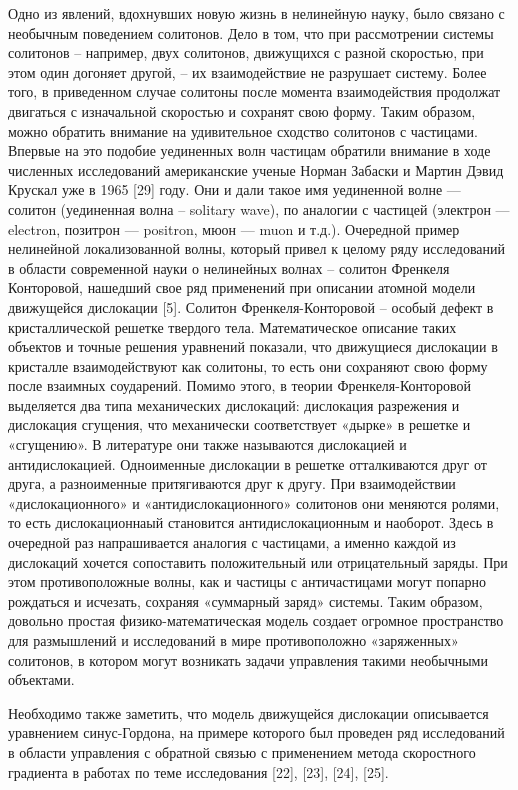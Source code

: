 Одно из явлений, вдохнувших новую жизнь в нелинейную науку, было связано с необычным поведением солитонов. Дело в том, что при рассмотрении системы солитонов – например, двух солитонов, движущихся с разной скоростью, при этом один догоняет другой, – их взаимодействие не разрушает систему. Более того, в приведенном случае солитоны после момента взаимодействия продолжат двигаться с изначальной скоростью и сохранят свою форму. Таким образом, можно обратить внимание на удивительное сходство солитонов с частицами. Впервые на это подобие уединенных волн частицам обратили внимание в ходе численных исследований американские ученые Норман Забаски и Мартин Дэвид Крускал уже в 1965 [29] году. Они и дали такое имя уединенной волне — солитон (уединенная волна – solitary wave), по аналогии с частицей (электрон — electron, позитрон — positron, мюон — muon и т.д.).
Очередной пример нелинейной локализованной волны, который привел к целому ряду исследований в области современной науки о нелинейных волнах – солитон Френкеля Конторовой, нашедший свое ряд применений при описании атомной модели движущейся дислокации [5]. Солитон Френкеля-Конторовой – особый дефект в кристаллической решетке твердого тела. Математическое описание таких объектов и точные решения уравнений показали, что движущиеся дислокации в кристалле взаимодействуют как солитоны, то есть они сохраняют свою форму после взаимных соударений. Помимо этого, в теории Френкеля-Конторовой выделяется два типа механических дислокаций: дислокация разрежения и дислокация сгущения, что механически соответствует «дырке» в решетке и «сгущению». В литературе они также называются дислокацией и антидислокацией. Одноименные дислокации в решетке отталкиваются друг от друга, а разноименные притягиваются друг к другу. При взаимодействии «дислокационного» и «антидислокационного» солитонов они меняются ролями, то есть дислокационнаый становится антидислокационным и наоборот. Здесь в очередной раз напрашивается аналогия с частицами, а именно каждой из дислокаций хочется сопоставить положительный или отрицательный заряды. При этом противоположные волны, как и частицы с античастицами могут попарно рождаться и исчезать, сохраняя «суммарный заряд» системы. Таким образом, довольно простая физико-математическая модель создает огромное пространство для размышлений и исследований в мире противоположно «заряженных» солитонов, в котором могут возникать задачи управления такими необычными объектами.

Необходимо также заметить, что модель движущейся дислокации описывается уравнением синус-Гордона, на примере которого был проведен ряд исследований в области управления с обратной связью с применением метода скоростного градиента в работах по теме исследования [22], [23], [24], [25].

